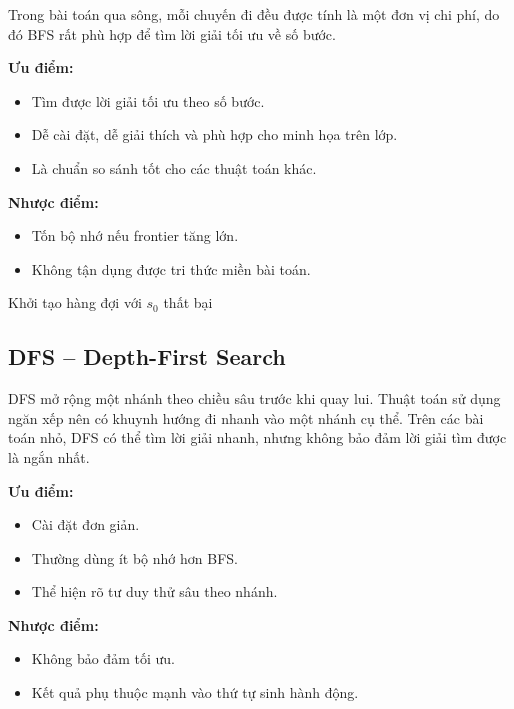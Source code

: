 \documentclass[a4paper,12pt]{article}
\begin{document}
Trong bài toán qua sông, mỗi chuyến đi đều được tính là một đơn vị chi phí, do đó BFS rất phù hợp để tìm lời giải tối ưu về số bước.

\textbf{Ưu điểm:}
\begin{itemize}
    \item Tìm được lời giải tối ưu theo số bước.
    \item Dễ cài đặt, dễ giải thích và phù hợp cho minh họa trên lớp.
    \item Là chuẩn so sánh tốt cho các thuật toán khác.
\end{itemize}

\textbf{Nhược điểm:}
\begin{itemize}
    \item Tốn bộ nhớ nếu frontier tăng lớn.
    \item Không tận dụng được tri thức miền bài toán.
\end{itemize}

\begin{algorithm}[H]
\caption{BFS}
Khởi tạo hàng đợi với $s_0$\;
\Return thất bại\;
\end{algorithm}

\subsection{DFS -- Depth-First Search}

DFS mở rộng một nhánh theo chiều sâu trước khi quay lui. Thuật toán sử dụng ngăn xếp nên có khuynh hướng đi nhanh vào một nhánh cụ thể. Trên các bài toán nhỏ, DFS có thể tìm lời giải nhanh, nhưng không bảo đảm lời giải tìm được là ngắn nhất.

\textbf{Ưu điểm:}
\begin{itemize}
    \item Cài đặt đơn giản.
    \item Thường dùng ít bộ nhớ hơn BFS.
    \item Thể hiện rõ tư duy thử sâu theo nhánh.
\end{itemize}

\textbf{Nhược điểm:}
\begin{itemize}
    \item Không bảo đảm tối ưu.
    \item Kết quả phụ thuộc mạnh vào thứ tự sinh hành động.
\end{itemize}
\end{document}
